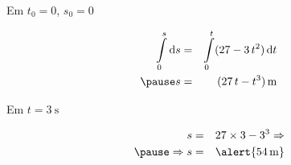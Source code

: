 \documentclass[12pt]{beamer}
\begin{document}
\begin{frame}
	Em $t_{0}=0$, $s_{0}=0$\pause
	
	\begin{eqnarray}
		\int\limits_{0}^{s}\text{d}s&=&\int\limits_{0}^{t}(27-3\,t^{2})\,\text{d}t\\\pause
		s&=&(27\,t-t^{3})\,\SI{}{\meter}
	\end{eqnarray}\pause

	Em $t=\SI{3}{\second}$\pause
	
	\begin{eqnarray}
		s&=&27\times 3-3^{3} \Rightarrow\\\pause
		\Rightarrow s&=&\alert{\SI{54}{\meter}}
	\end{eqnarray}\pause
\end{frame}
\end{document}
